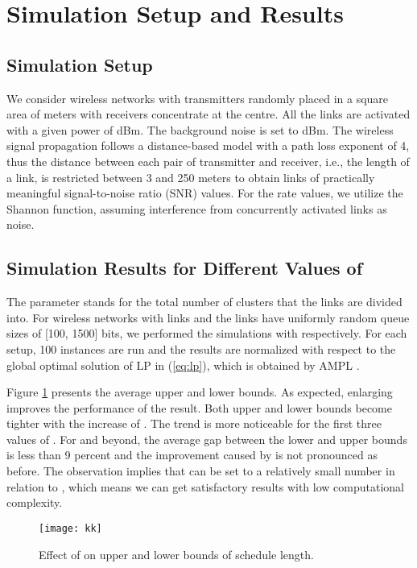 \documentclass[10pt,onecolumn,journal,draftcls,oneside]{IEEEtran}
\begin{document}
\section{Simulation Setup and Results}
\label{sec:simulation}

\subsection{Simulation Setup}

We consider wireless networks with  transmitters randomly placed in a square area of   meters with receivers concentrate at the centre. All the links are activated with a given power of  dBm. The background noise is set to  dBm. The wireless signal propagation follows a distance-based model with a path loss exponent of 4, thus the distance between each pair of transmitter and receiver, i.e., the length of a link, is restricted between 3 and 250 meters to obtain links of practically meaningful signal-to-noise ratio (SNR) values. For the rate values, we utilize the Shannon function, assuming interference from concurrently activated links as noise.

\subsection{Simulation Results for Different Values of }

The parameter  stands for the total number of clusters that the links are divided into. For wireless networks with  links and the links have uniformly random queue sizes of [100, 1500] bits, we performed the simulations with  respectively. For each setup, 100 instances are run and the results are normalized with respect to the global optimal solution of LP in (\ref{eq:lp}), which is obtained by AMPL \cite{AMPL02}. 

Figure \ref{fig:kk} presents the average upper and lower bounds. As expected, enlarging  improves the performance of the result. Both upper and lower bounds become tighter with the increase of . The trend is more noticeable for the first three values of . For  and beyond, the average gap between the lower and upper bounds is less than 9 percent and the improvement caused by  is not pronounced as before. The observation implies that  can be set to a relatively small number in relation to , which means we can get satisfactory results with low computational complexity.

\begin{figure} [ht!]	
    \centering
{\texttt{[image: kk]}}
\vspace{-5mm}
\caption{Effect of  on upper and lower bounds of schedule length.}
\label{fig:kk}
\end{figure}
\end{document}
